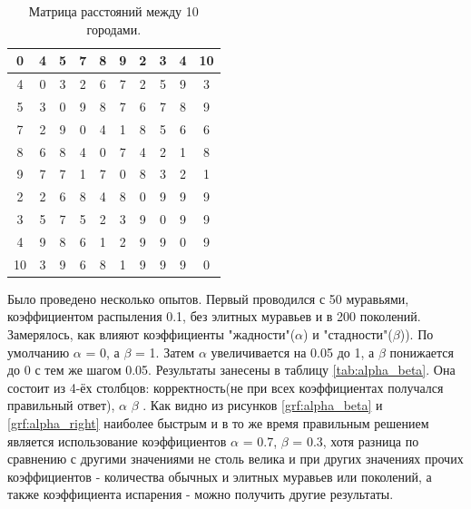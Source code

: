 \documentclass[12pt, a4paper]{report}
\begin{document}
    \begin{table}[ht!]
    \centering
    	\begin{tabular}{ | c | c | c | c | c | c | c | c | c | c | }
    		\hline 0 & 4 & 5 & 7 & 8 & 9 & 2 & 3 & 4 & 10 \\
    		\hline 4 & 0 & 3 & 2 & 6 & 7 & 2 & 5 & 9 & 3 \\
    		\hline 5 & 3 & 0 & 9 & 8 & 7 & 6 & 7 & 8 & 9 \\
    		\hline 7 & 2 & 9 & 0 & 4 & 1 & 8 & 5 & 6 & 6 \\
    		\hline 8 & 6 & 8 & 4 & 0 & 7 & 4 & 2 & 1 & 8 \\
    		\hline 9 & 7 & 7 & 1 & 7 & 0 & 8 & 3 & 2 & 1 \\
    		\hline 2 & 2 & 6 & 8 & 4 & 8 & 0 & 9 & 9 & 9 \\
    		\hline 3 & 5 & 7 & 5 & 2 & 3 & 9 & 0 & 9 & 9 \\
    		\hline 4 & 9 & 8 & 6 & 1 & 2 & 9 & 9 & 0 & 9 \\
    		\hline 10 & 3 & 9 & 6 & 8 & 1 & 9 & 9 & 9 & 0 \\
    		\hline
    	\end{tabular}
    	\label{tab:matr_dist}
    		\caption{Матрица расстояний между 10 городами.}
    \end{table} 
    
    Было проведено несколько опытов. Первый проводился с 50 муравьями, коэффициентом распыления 0.1, без элитных муравьев и в 200 поколений. Замерялось, как влияют коэффициенты "жадности"($\alpha$) и "стадности"($\beta$)). По умолчанию $\alpha$ = 0, а $\beta$ = 1. Затем $\alpha$ увеличивается на 0.05 до 1, а $\beta$ понижается до 0 с тем же шагом 0.05. Результаты занесены в таблицу \ref{tab:alpha_beta}. Она состоит из 4-ёх столбцов: корректность(не при всех коэффициентах получался правильный ответ), $\alpha$ \text{,} $\beta$ . Как видно из рисунков \ref{grf:alpha_beta} и \ref{grf:alpha_right} наиболее быстрым и в то же время правильным решением является использование коэффициентов $\alpha$ = 0.7, $\beta$ = 0.3, хотя разница по сравнению с другими значениями не столь велика и  при других значениях прочих коэффициентов - количества обычных и элитных муравьев или поколений, а также коэффициента испарения - можно получить другие результаты.
    
    \newpage
    
\end{document}

